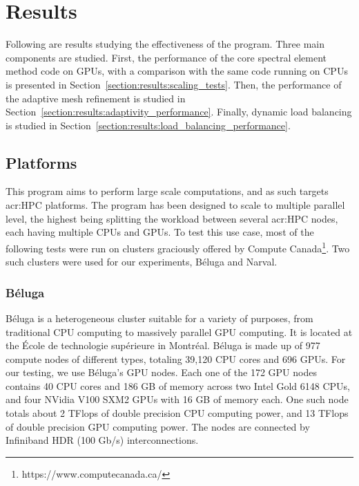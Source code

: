 \chapter{Results} \label{chapter:results}

Following are results studying the effectiveness of the program. Three main components are studied.
First, the performance of the core spectral element method code on GPUs, with a comparison with the
same code running on CPUs is presented in Section~\ref{section:results:scaling_tests}. Then, the
performance of the adaptive mesh refinement is studied in
Section~\ref{section:results:adaptivity_performance}. Finally, dynamic load balancing is studied in
Section~\ref{section:results:load_balancing_performance}.

\section{Platforms} \label{section:results:platforms}

This program aims to perform large scale computations, and as such targets \acrshort{acr:HPC}
platforms. The program has been designed to scale to multiple parallel level, the highest being
splitting the workload between several \acrshort{acr:HPC} nodes, each having multiple CPUs and GPUs.
To test this use case, most of the following tests were run on clusters graciously offered by
Compute Canada\footnote{https://www.computecanada.ca/}. Two such clusters were used for our
experiments, Béluga and Narval.

\subsection{Béluga} \label{subsection:results:platforms:beluga}

Béluga is a heterogeneous cluster suitable for a variety of purposes, from traditional CPU computing
to massively parallel GPU computing. It is located at the École de technologie supérieure in
Montréal. Béluga is made up of 977 compute nodes of different types, totaling 39,120 CPU cores and
696 GPUs. For our testing, we use Béluga's GPU nodes. Each one of the 172 GPU nodes contains 40 CPU
cores and 186 GB of memory across two Intel Gold 6148 CPUs, and four NVidia V100 SXM2 GPUs with 16
GB of memory each. One such node totals about 2 TFlops of double precision CPU computing power, and
13 TFlops of double precision GPU computing power. The nodes are connected by Infiniband HDR (100
Gb/s) interconnections.

